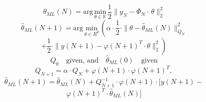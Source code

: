 \begin{tcolorbox}[colback=yellow!5!white,colframe=yellow!75!white,coltitle=black,title=Recursive Linear Least Squares]
	\begin{equation*}
	\theta_{ML}(N)= \text{arg} \, \underset { \theta \in \mathbb{R} }{ \text{min} } \, \frac { 1 }{ 2 } \parallel y_N - \Phi_N \cdot \, \theta{ \parallel }_{ 2 }^{ 2 }
	\end{equation*}
	\begin{equation*}
	\hat \theta_{ML} (N+1) = \text{arg} \, \underset { \theta \in R^d }{ \text{min} } \, \left(\alpha \cdot \frac { 1 }{ 2 } \cdot \parallel \theta - \hat{\theta}_{ML}(N) \parallel_{ Q_N }^{ 2 } \right.
	\end{equation*}
	\begin{equation*}
	\left. + \frac { 1 }{ 2 } \cdot \parallel y(N+1) - \varphi (N+1)^T \cdot \theta \parallel_{ 2 }^{ 2 } \right)
	\end{equation*}
	\begin{equation*}
	Q_0 \quad \text{given, and} \quad \hat{ \theta } _{ML}(0) \quad \text{given}
	\end{equation*}
	\begin{equation*}
	Q_{ N+1 } = \alpha \cdot Q_N + \varphi (N+1) \cdot  \varphi (N+1)^{T},
	\end{equation*}
	\begin{equation*}
	\hat { \theta  } _{ML}(N+1) = \hat { \theta } _{ML}(N)+Q_{N+1}^{ -1} \cdot  \varphi (N+1) \cdot [y(N+1) -
	\end{equation*}
	\begin{equation*}
	\varphi(N+1)^T  \cdot \hat{ \theta }_{ML}(N)]
	\end{equation*}
\end{tcolorbox}

